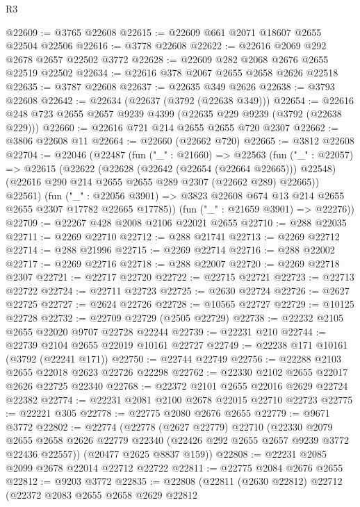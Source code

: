 \begin{lexlean}{R3}
\begin{coremodule}
@22609 := @3765 @22608
@22615 := @22609 @661 @2071 @18607 @2655 @22504 @22506
@22616 := @3778 @22608
@22622 := @22616 @2069 @292 @2678 @2657 @22502 @3772
@22628 := @22609 @282 @2068 @2676 @2655 @22519 @22502
@22634 := @22616 @378 @2067 @2655 @2658 @2626 @22518
@22635 := @3787 @22608
@22637 := @22635 @349 @2626
@22638 := @3793 @22608
@22642 := @22634 (@22637 (@3792 (@22638 @349)))
@22654 := @22616 @248 @723 @2655 @2657 @9239 @4399 (@22635 @229 @9239 (@3792 (@22638 @229)))
@22660 := @22616 @721 @214 @2655 @2655 @720 @2307
@22662 := @3806 @22608 @11
@22664 := @22660 (@22662 @720)
@22665 := @3812 @22608
@22704 := @22046
    (@22487
      (fun ("_" : @21660) =>
      @22563
        (fun ("_" : @22057) =>
        @22615
          (@22622
            (@22628 (@22642 (@22654 (@22664 @22665))) @22548)
            (@22616 @290 @214 @2655 @2655 @289 @2307 (@22662 @289) @22665))
          @22561)
        (fun ("_" : @22056 @3901) =>
        @3823 @22608 @674 @13 @214 @2655 @2655 @2307 @17782 @22665 @17785))
      (fun ("_" : @21659 @3901) => @22276))
@22709 := @22267 @428 @2008 @2106 @22021 @2655
@22710 := @288 @22035
@22711 := @2269 @22710
@22712 := @288 @21741
@22713 := @2269 @22712
@22714 := @288 @21996
@22715 := @2269 @22714
@22716 := @288 @22002
@22717 := @2269 @22716
@22718 := @288 @22007
@22720 := @2269 @22718 @2307
@22721 := @22717 @22720
@22722 := @22715 @22721
@22723 := @22713 @22722
@22724 := @22711 @22723
@22725 := @2630 @22724
@22726 := @2627 @22725
@22727 := @2624 @22726
@22728 := @10565 @22727
@22729 := @10125 @22728
@22732 := @22709 @22729 (@2505 @22729)
@22738 := @22232 @2105 @2655 @22020 @9707 @22728 @22244
@22739 := @22231 @210
@22744 := @22739 @2104 @2655 @22019 @10161 @22727
@22749 := @22238 @171 @10161 (@3792 (@22241 @171))
@22750 := @22744 @22749
@22756 := @22288 @2103 @2655 @22018 @2623 @22726 @22298
@22762 := @22330 @2102 @2655 @22017 @2626 @22725 @22340
@22768 := @22372 @2101 @2655 @22016 @2629 @22724 @22382
@22774 := @22231 @2081 @2100 @2678 @22015 @22710 @22723
@22775 := @22221 @305
@22778 := @22775 @2080 @2676 @2655
@22779 := @9671 @3772
@22802 := @22774
    (@22778
      (@2627 @22779)
      @22710
      (@22330
        @2079
        @2655
        @2658
        @2626
        @22779
        @22340
        (@22426 @292 @2655 @2657 @9239 @3772 @22436 @22557))
      (@20477 @2625 @8837 @159))
@22808 := @22231 @2085 @2099 @2678 @22014 @22712 @22722
@22811 := @22775 @2084 @2676 @2655
@22812 := @9203 @3772
@22835 := @22808
    (@22811
      (@2630 @22812)
      @22712
      (@22372
        @2083
        @2655
        @2658
        @2629
        @22812

\end{coremodule}
\end{lexlean}
